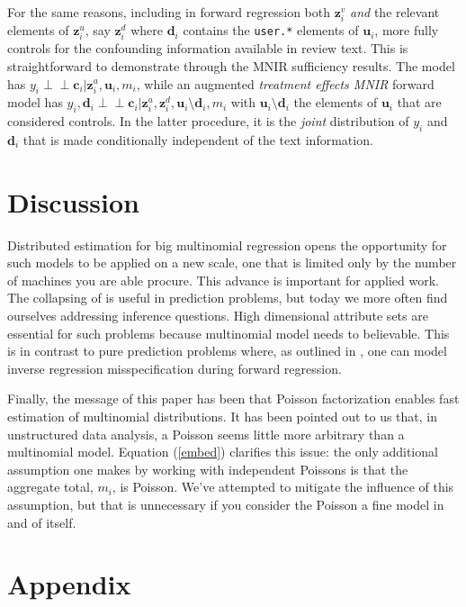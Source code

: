 \documentclass[12pt]{article}
\newcommand{\bm}[1]{\mathbf{#1}}
\newcommand{\indep}{\perp\!\!\!\perp}
\newcommand{\cd}[1]{{\tt#1}}
\begin{document}
For the same reasons, including in forward regression both $\bm{z}_i^v$ {\it
and} the relevant elements of $\bm{z}_i^u$, say $\bm{z}_i^d$ where $\bm{d}_i$
contains the \cd{user.*} elements of $\bm{u}_i$, more fully controls for the
confounding information available in review text. This is straightforward to
demonstrate through the MNIR sufficiency results.  The model  has $y_i \indep
\bm{c}_i | \bm{z}^a_i, \bm{u}_i, m_i$, while an augmented {\it treatment
effects MNIR} forward model has $y_i, \bm{d}_i \indep
\bm{c}_i | \bm{z}^a_i,\bm{z}^d_i, \bm{u}_i\!\setminus\!\bm{d}_i, m_i$ with
$\bm{u}_i\!\setminus\!\bm{d}_i$ the  elements of $\bm{u}_i$ that are
considered controls. In the latter procedure, it is  the {\it joint}
distribution of $y_i$ and $\bm{d}_i$ that is made conditionally independent of
the text information.

\section{Discussion}
\label{END}

Distributed estimation for big multinomial regression opens the opportunity
for such models to be applied on a new  scale, one that is limited only by the
number of machines you are able procure. This advance is important for applied
work.  The collapsing of
\cite{taddy_multinomial_2013} is useful in prediction problems, but today
we more often find ourselves addressing inference questions.  High dimensional
attribute sets are essential for such problems because multinomial model needs
to believable. This is in contrast to pure prediction problems where, as
outlined in \cite{taddy_rejoinder:_2013}, one can model inverse regression
misspecification during forward regression.

Finally, the message of this paper has been that Poisson factorization
enables fast estimation of multinomial distributions.  It has been pointed out
to us that, in unstructured data analysis, a Poisson seems little more
arbitrary than a multinomial model.  Equation (\ref{embed}) clarifies this
issue:  the only additional assumption one makes by working with independent
Poissons is that the aggregate total, $m_i$, is Poisson.  We've attempted to
mitigate the influence of this assumption, but that is unnecessary if you
consider the Poisson a fine model in and of itself.

\appendix
\section{Appendix}
\end{document}
